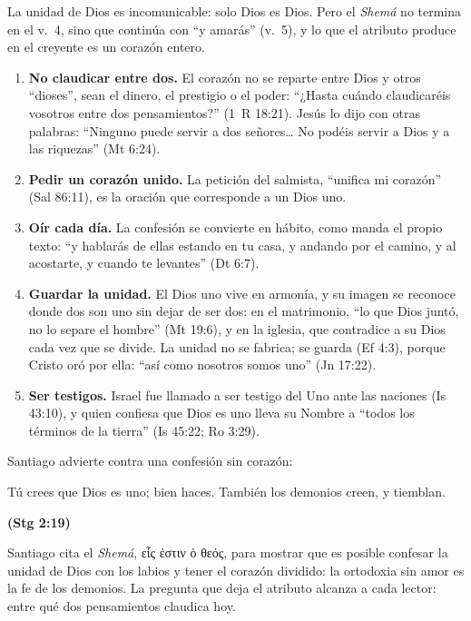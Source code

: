 \documentclass[11pt,letterpaper]{article}
\newcommand{\grc}[1]{\foreignlanguage{ancientgreek}{#1}}
\newcommand{\fuente}[1]{\par\hfill{\upshape\bfseries\small\textcolor{azul}{#1}}}
\begin{document}
La unidad de Dios es incomunicable: solo Dios es Dios. Pero el \emph{Shemá} no termina en el v.~4, sino que continúa con ``y amarás'' (v.~5), y lo que el atributo produce en el creyente es un corazón entero.

\begin{enumerate}
\item \textbf{No claudicar entre dos.} El corazón no se reparte entre Dios y otros ``dioses'', sean el dinero, el prestigio o el poder: ``¿Hasta cuándo claudicaréis vosotros entre dos pensamientos?'' (1~R 18:21). Jesús lo dijo con otras palabras: ``Ninguno puede servir a dos señores\ldots{} No podéis servir a Dios y a las riquezas'' (Mt 6:24).
\item \textbf{Pedir un corazón unido.} La petición del salmista, ``unifica mi corazón'' (Sal 86:11), es la oración que corresponde a un Dios uno.
\item \textbf{Oír cada día.} La confesión se convierte en hábito, como manda el propio texto: ``y hablarás de ellas estando en tu casa, y andando por el camino, y al acostarte, y cuando te levantes'' (Dt 6:7).
\item \textbf{Guardar la unidad.} El Dios uno vive en armonía, y su imagen se reconoce donde dos son uno sin dejar de ser dos: en el matrimonio, ``lo que Dios juntó, no lo separe el hombre'' (Mt 19:6), y en la iglesia, que contradice a su Dios cada vez que se divide. La unidad no se fabrica; se guarda (Ef 4:3), porque Cristo oró por ella: ``así como nosotros somos uno'' (Jn 17:22).
\item \textbf{Ser testigos.} Israel fue llamado a ser testigo del Uno ante las naciones (Is 43:10), y quien confiesa que Dios es uno lleva su Nombre a ``todos los términos de la tierra'' (Is 45:22; Ro 3:29).
\end{enumerate}

Santiago advierte contra una confesión sin corazón:

\begin{cita}Tú crees que Dios es uno; bien haces. También los demonios creen, y tiemblan.\fuente{(Stg 2:19)}\end{cita}

Santiago cita el \emph{Shemá}, \grc{εἷς ἐστιν ὁ θεός}, para mostrar que es posible confesar la unidad de Dios con los labios y tener el corazón dividido: la ortodoxia sin amor es la fe de los demonios. La pregunta que deja el atributo alcanza a cada lector: entre qué dos pensamientos claudica hoy.

\end{document}
